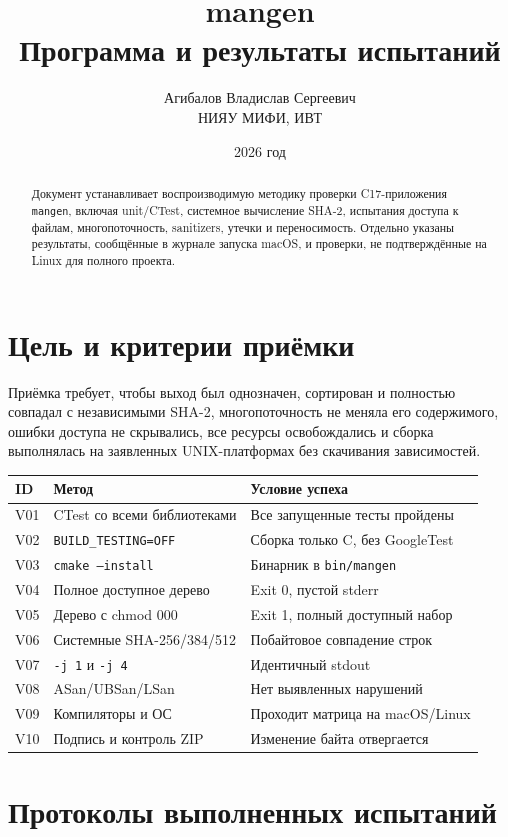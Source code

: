 \documentclass[12pt,a4paper]{article}
\title{mangen\\Программа и результаты испытаний}
\author{Агибалов Владислав Сергеевич\\НИЯУ МИФИ, ИВТ}
\date{2026 год}
\begin{document}
\maketitle
\begin{abstract}
Документ устанавливает воспроизводимую методику проверки C17-приложения
\texttt{mangen}, включая unit/CTest, системное вычисление SHA-2, испытания
доступа к файлам, многопоточность, sanitizers, утечки и переносимость.
Отдельно указаны результаты, сообщённые в журнале запуска macOS,
и проверки, не подтверждённые на Linux для полного проекта.
\end{abstract}
\tableofcontents
\newpage

\section{Цель и критерии приёмки}

Приёмка требует, чтобы выход был однозначен, сортирован и полностью
совпадал с независимыми SHA-2, многопоточность не меняла его содержимого,
ошибки доступа не скрывались, все ресурсы освобождались и сборка выполнялась
на заявленных UNIX-платформах без скачивания зависимостей.

\begin{longtable}{P{0.14\textwidth}P{0.47\textwidth}P{0.29\textwidth}}
\toprule
ID & Метод & Условие успеха \\
\midrule
\endhead
V01 & CTest со всеми библиотеками & Все запущенные тесты пройдены \\
V02 & \texttt{BUILD\_TESTING=OFF} & Сборка только C, без GoogleTest \\
V03 & \texttt{cmake --install} & Бинарник в \texttt{bin/mangen} \\
V04 & Полное доступное дерево & Exit 0, пустой stderr \\
V05 & Дерево с chmod 000 & Exit 1, полный доступный набор \\
V06 & Системные SHA-256/384/512 & Побайтовое совпадение строк \\
V07 & \texttt{-j 1} и \texttt{-j 4} & Идентичный stdout \\
V08 & ASan/UBSan/LSan & Нет выявленных нарушений \\
V09 & Компиляторы и ОС & Проходит матрица на macOS/Linux \\
V10 & Подпись и контроль ZIP & Изменение байта отвергается \\
\bottomrule
\end{longtable}

\section{Протоколы выполненных испытаний}
\end{document}
